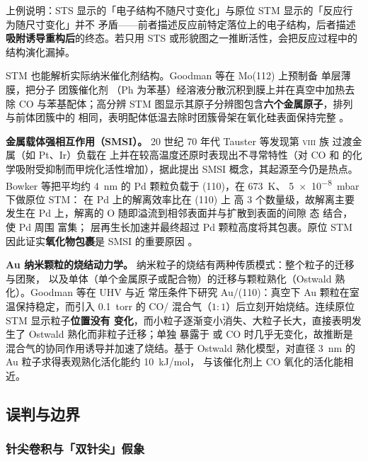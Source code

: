 \begin{infer}
上例说明：STS 显示的「电子结构不随尺寸变化」与原位 STM 显示的「反应行为随尺寸变化」并不
矛盾——前者描述反应前特定落位上的电子结构，后者描述\textbf{吸附诱导重构后}的终态。若只用
STS 或形貌图之一推断活性，会把反应过程中的结构演化漏掉。
\end{infer}

STM 也能解析实际纳米催化剂结构。Goodman 等在 Mo(112) 上预制备  单层薄膜，把分子
团簇催化剂 （Ph 为苯基）经溶液分散沉积到膜上并在真空中加热去除 CO
与苯基配体；高分辨 STM 图显示其原子分辨图包含\textbf{六个金属原子}，排列与前体团簇中的
 相同，表明配体低温去除时团簇骨架在氧化硅表面保持完整
。

\textbf{金属载体强相互作用（SMSI）。} 20 世纪 70 年代 Tauster 等发现第 \textsc{viii} 族
过渡金属（如 Pt、Ir）负载在  上并在较高温度还原时表现出不寻常特性（对 CO 和
 的化学吸附受抑制而甲烷化活性增加），据此提出 SMSI 概念，其起源至今仍是热点。
Bowker 等把平均约 \qty{4}{nm} 的 Pd 颗粒负载于 (110)，在 \qty{673}{K}、
\qty{5e-8}{mbar}  下做原位 STM： 在 Pd 上的解离效率比在 (110) 上
高 3 个数量级，故解离主要发生在 Pd 上，解离的 O 随即溢流到相邻表面并与扩散到表面的间隙
态  结合，使 Pd 周围  富集； 层再生长加速并最终超过 Pd
颗粒高度将其包裹。原位 STM 因此证实\textbf{氧化物包裹}是 SMSI 的重要原因
。

\textbf{Au 纳米颗粒的烧结动力学。} 纳米粒子的烧结有两种传质模式：整个粒子的迁移与团聚，
以及单体（单个金属原子或配合物）的迁移与颗粒熟化（Ostwald 熟化）。Goodman 等在 UHV 与近
常压条件下研究 Au/(110)：真空下 Au 颗粒在室温保持稳定，而引入 \qty{0.1}{torr}
的 CO/ 混合气（$1\!:\!1$）后立刻开始烧结。连续原位 STM 显示粒子\textbf{位置没有
变化}，而小粒子逐渐变小消失、大粒子长大，直接表明发生了 Ostwald 熟化而非粒子迁移；单独
暴露于  或 CO 时几乎无变化，故推断是混合气的协同作用诱导并加速了烧结。基于
Ostwald 熟化模型，对直径 \qty{3}{nm} 的 Au 粒子求得表观熟化活化能约 \qty{10}{kJ/mol}，
与该催化剂上 CO 氧化的活化能相近。
\subsection{误判与边界}
\label{sec:stm-pitfall}

\subsubsection{针尖卷积与「双针尖」假象}

